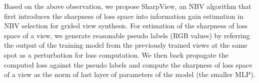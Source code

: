

Based on the above observation, we propose SharpView, an NBV algorithm that first introduces the sharpness of loss space into information gain estimation in NBV selection for grided view synthesis.
For estimation of the sharpness of loss space of a view, we generate reasonable pseudo labels (RGB values) by referring the output of the training model from the previously trained views at the same spot as a perturbation for loss computation.
We then back propagate the computed loss against the pseudo labels and compute the sharpness of loss space of a view as the norm of last layer of parameters of the model (the smaller MLP).

